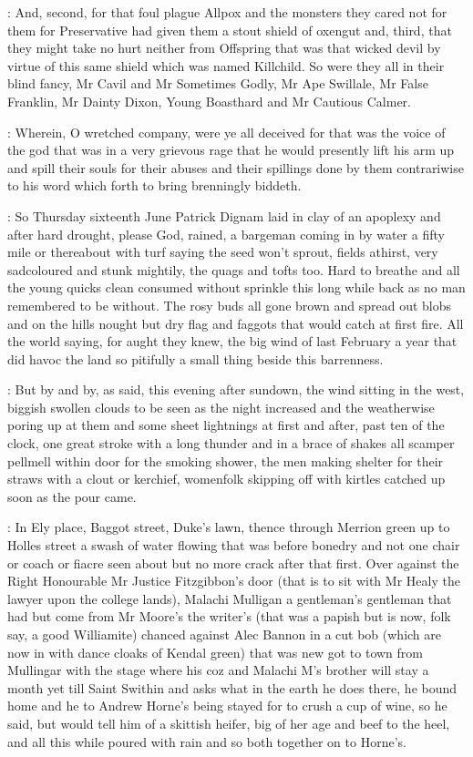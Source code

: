 :
And,
second,
for that foul plague Allpox and the monsters they cared
not for them for Preservative had given them a stout shield of oxengut
and,
third,
that they might take no hurt neither from Offspring that was
that wicked devil by virtue of this same shield which was named Killchild.
So were they all in their blind fancy,
Mr Cavil and Mr Sometimes Godly,
Mr
Ape Swillale,
Mr False Franklin,
Mr Dainty Dixon,
Young Boasthard and Mr
Cautious Calmer.

:
Wherein,
O wretched company,
were ye all deceived for that was the voice
of the god that was in a very grievous rage that he would presently lift
his arm up and spill their souls for their abuses and their spillings
done by them contrariwise to his word which forth to bring brenningly
biddeth.



:
So Thursday sixteenth June Patrick Dignam laid in clay of an apoplexy
and after hard drought,
please God,
rained,
a bargeman coming in by water
a fifty mile or thereabout with turf saying the seed won't sprout,
fields athirst,
very sadcoloured and stunk mightily,
the quags and tofts too.
Hard to breathe and all the young quicks clean consumed without sprinkle
this long while back as no man remembered to be without.
The rosy buds all gone brown and spread out blobs
and on the hills nought but dry flag
and faggots that would catch at first fire.
All the world saying,
for
aught they knew,
the big wind of last February a year that did havoc the
land so pitifully a small thing beside this barrenness.

:
But by and by,
as said,
this evening after sundown,
the wind sitting
in the west,
biggish swollen clouds to be seen as the night increased and
the weatherwise poring up at them and some sheet lightnings at first and
after,
past ten of the clock,
one great stroke with a long thunder and in
a brace of shakes all scamper pellmell within door for the smoking shower,
the men making shelter for their straws with a clout or kerchief,
womenfolk skipping off with kirtles catched up soon as the pour came.

:
In Ely place,
Baggot street,
Duke's lawn,
thence through Merrion
green up to Holles street a swash of water flowing that was before bonedry
and not one chair or coach or fiacre seen about but no more crack after
that first.
Over against the Right Honourable Mr Justice Fitzgibbon's door
(that is to sit with Mr Healy the lawyer upon the college lands),
Malachi Mulligan a gentleman's gentleman that had but come from Mr Moore's the
writer's
(that was a papish but is now,
folk say,
a good Williamite)
chanced against Alec Bannon in a cut bob
(which are now in with dance
cloaks of Kendal green) that was new got to town from Mullingar with the
stage where his coz and Malachi M's brother will stay a month yet till Saint Swithin
and asks what in the earth he does there,
he bound home and
he to Andrew Horne's being stayed for to crush a cup of wine,
so he said,
but would tell him of a skittish heifer,
big of her age and beef to the
heel,
and all this while poured with rain and so both together on to
Horne's.

